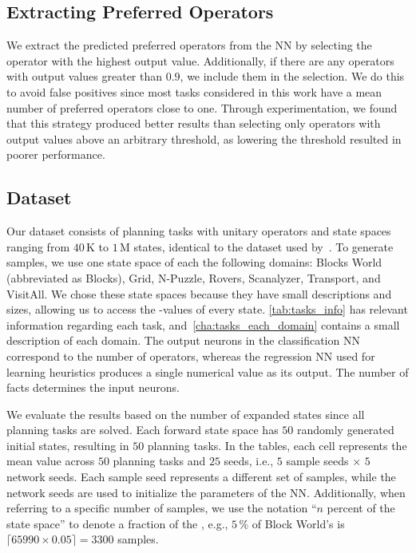 \documentclass[ppgc,diss,english]{iiufrgs}
\begin{document}
\subsection{Extracting Preferred Operators}
\label{sec:exp-extracting-pos}
We extract the predicted preferred operators from the NN by selecting the operator with the highest output value. Additionally, if there are any operators with output values greater than $0.9$, we include them in the selection. We do this to avoid false positives since most tasks considered in this work have a mean number of preferred operators close to one. Through experimentation, we found that this strategy produced better results than selecting only operators with output values above an arbitrary threshold, as lowering the threshold resulted in poorer performance.


\subsection{Dataset}
\label{sec:exp-dataset}
Our dataset consists of planning tasks with unitary operators and state spaces ranging from $40$\,K to $1$\,M states, identical to the dataset used by~\citet{Bettker.etal/2022}. To generate samples, we use one state space of each the following domains: Blocks World (abbreviated as Blocks), Grid, N-Puzzle, Rovers, Scanalyzer, Transport, and VisitAll.
We chose these state spaces because they have small descriptions and sizes, allowing us to access the \hstar-values of every state.
\cref{tab:tasks_info} has relevant information regarding each task, and~\vref{cha:tasks_each_domain} contains a small description of each domain.
The output neurons in the classification NN correspond to the number of operators, whereas the regression NN used for learning heuristics produces a single numerical value as its output. The number of facts determines the input neurons.



We evaluate the results based on the number of expanded states since all planning tasks are solved. Each forward state space \fsp has $50$ randomly generated initial states, resulting in $50$ planning tasks. %
In the tables, each cell represents the mean value across $50$ planning tasks and $25$ seeds, i.e., $5$ sample seeds $\times$ $5$ network seeds. Each sample seed represents a different set of samples, while the network seeds are used to initialize the parameters of the NN.
Additionally, when referring to a specific number of samples, we use the notation ``$n$ percent of the state space'' to denote a fraction of the \fsp, e.g., $5\,\%$ of Block World's \fsp is $\lceil 65990 \times 0.05 \rceil = 3300$ samples.
\end{document}

